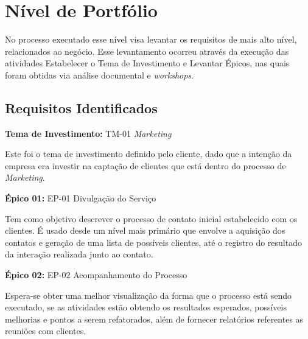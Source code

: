 \chapter[Nível de Portfólio]{Nível de Portfólio}

No processo executado esse nível visa levantar os requisitos de mais alto nível, relacionados ao negócio. Esse levantamento
ocorreu através da execução das atividades Estabelecer o Tema de Investimento e Levantar Épicos, nas quais foram obtidas via análise documental e \textit{workshops}.

\section{Requisitos Identificados}

\textbf{Tema de Investimento:} TM-01 \textit{Marketing}

Este foi o tema de investimento definido pelo cliente, dado que a intenção da empresa era investir na captação de clientes que está
dentro do processo de \textit{Marketing}.

\textbf{Épico 01:} EP-01 Divulgação do Serviço

Tem como objetivo descrever o processo de contato inicial estabelecido com os clientes. É usado desde um nível mais primário que envolve a aquisição dos contatos e geração de uma lista de possíveis clientes, até o registro do resultado da interação realizada junto ao contato.


\textbf{Épico 02:} EP-02 Acompanhamento do Processo

Espera-se obter uma melhor visualização da forma que o processo está sendo executado, se as atividades estão obtendo os resultados esperados, possíveis melhorias e pontos a serem refatorados, além de fornecer relatórios referentes as reuniões com clientes.
